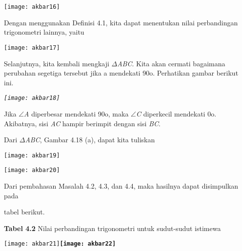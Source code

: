 \documentclass[11pt,fleqn]{book} %
\begin{document}
\noindent \texttt{[image: akbar16]}

\noindent 

\noindent Dengan menggunakan Definisi 4.1, kita dapat menentukan nilai perbandingan trigonometri lainnya, yaitu

\noindent \texttt{[image: akbar17]}

\noindent 

\noindent 

\noindent Selanjutnya, kita kembali mengkaji $\Delta$\textit{ABC}. Kita akan cermati bagaimana perubahan segetiga tersebut jika a mendekati 90o. Perhatikan gambar berikut ini.

\noindent \textit{\texttt{[image: akbar18]}}

\noindent \textit{}

\noindent Jika $\mathrm{\angle }$\textit{A }diperbesar mendekati 90o, maka $\mathrm{\angle }$\textit{C }diperkecil mendekati 0o. Akibatnya, sisi \textit{AC }hampir berimpit dengan sisi \textit{BC}.

\noindent 

\noindent Dari $\Delta$\textit{ABC}, Gambar 4.18 (a), dapat kita tuliskan

\noindent 

\noindent \texttt{[image: akbar19]}

\noindent 

\noindent \texttt{[image: akbar20]}

\noindent 

\noindent 

\noindent Dari pembahasan Masalah 4.2, 4.3, dan 4.4, maka hasilnya dapat disimpulkan pada

\noindent tabel berikut.

\noindent \textbf{Tabel 4.2 }Nilai perbandingan trigonometri untuk sudut-sudut istimewa

\noindent 

\noindent \texttt{[image: akbar21]}\textbf{\texttt{[image: akbar22]}}

\noindent \textbf{}

\noindent \textbf{}

\noindent \textbf{}
\end{document}
